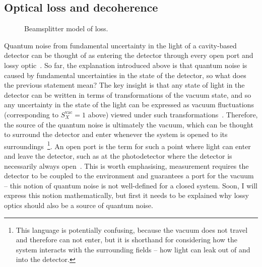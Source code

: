 \subsection{Optical loss and decoherence}
\label{sec:optical_loss_background}

\begin{figure}
	\centering
	\caption{Beamsplitter model of loss.}
	\label{fig:beamsplitter_loss}
\end{figure}

Quantum noise from fundamental uncertainty in the light of a cavity-based detector can be thought of as entering the detector through every open port and lossy optic~\cite{}. So far, the explanation introduced above is that quantum noise is caused by fundamental uncertainties in the state of the detector, so what does the previous statement mean? %
The key insight is that any state of light in the detector can be written in terms of transformations of the vacuum state, and so any uncertainty in the state of the light can be expressed as vacuum fluctuations (corresponding to $S_X^\text{vac}=1$ above) viewed under such transformations~\cite{}. Therefore, the source of the quantum noise is ultimately the vacuum, which can be thought to surround the detector and enter whenever the system is opened to its surroundings~\footnote{This language is potentially confusing, because the vacuum does not travel and therefore can not enter, but it is shorthand for considering how the system interacts with the surrounding fields -- how light can leak out of and into the detector.}. An open port is the term for such a point where light can enter and leave the detector, such as at the photodetector where the detector is necessarily always open~\cite{}. This is worth emphasising, measurement requires the detector to be coupled to the environment and guarantees a port for the vacuum -- this notion of quantum noise is not well-defined for a closed system. Soon, I will express this notion mathematically, but first it needs to be explained why lossy optics should also be a source of quantum noise.

